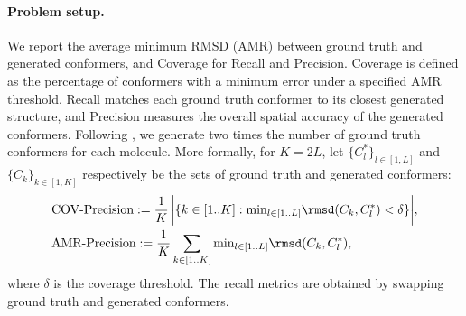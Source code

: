 \paragraph{Problem setup.}
We report the average minimum RMSD (AMR) between ground truth and generated conformers, and Coverage for Recall and Precision. Coverage is defined as the percentage of conformers with a minimum error under a specified AMR threshold. Recall matches each ground truth conformer to its closest generated structure, and Precision measures the overall spatial accuracy of the generated conformers.
Following \citet{torsional-diffusion}, we generate two times the number of ground truth conformers for each molecule. More formally, for $K=2L$, let $\{C^*_l\}_{l \in [1, L]}$ and $\{C_k\}_{k \in [1, K]}$ respectively be the sets of ground truth and generated conformers:
\begin{equation}
\begin{aligned}
&\text{COV-Precision} := \frac{1}{K}\, \bigg\lvert\{ k \in [1..K]: \text{min}_{ l\in [1..L]} \rmsd(C_k, C^*_l) < \delta \} \bigg\rvert,\\
&\text{AMR-Precision} := \frac{1}{K} \sum_{k \in [1..K]}  \text{min}_{ l\in [1..L]} \rmsd(C_k, C^*_l),\\
\end{aligned}
\label{eq:amr}
\end{equation}
where $\delta$ is the coverage threshold. The recall metrics are obtained by swapping ground truth and generated conformers. 
